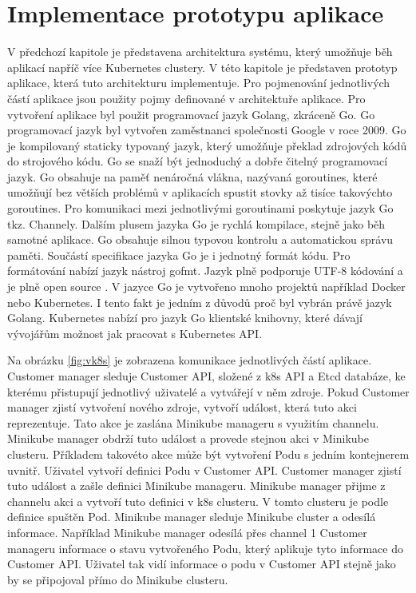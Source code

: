 \section{Implementace prototypu aplikace}
V předchozí kapitole je představena architektura systému, který umožňuje běh aplikací napříč více Kubernetes clustery. V této kapitole je představen prototyp aplikace, která tuto architekturu implementuje. Pro pojmenování jednotlivých částí aplikace jsou použity pojmy definované v architektuře aplikace. Pro vytvoření aplikace byl použit programovací jazyk Golang, zkráceně Go. Go programovací jazyk byl vytvořen zaměstnanci společnosti Google v roce 2009. Go je kompilovaný staticky typovaný jazyk, který umožňuje překlad zdrojových kódů do strojového kódu. Go se snaží být jednoduchý a dobře čitelný programovací jazyk. Go obsahuje na paměť nenáročná vlákna, nazývaná goroutines, které umožňují bez větších problémů v aplikacích spustit stovky až tisíce takovýchto goroutines. Pro komunikaci mezi jednotlivými goroutinami poskytuje jazyk Go tkz. Channely. Dalším plusem jazyka Go je rychlá kompilace, stejně jako běh samotné aplikace. Go obsahuje silnou typovou kontrolu a automatickou správu paměti. Součástí specifikace jazyka Go je i jednotný formát kódu. Pro formátování nabízí jazyk nástroj gofmt. Jazyk plně podporuje UTF-8 kódování a je plně open source \cite{miek}. V jazyce Go je vytvořeno mnoho projektů například Docker nebo Kubernetes. I tento fakt je jedním z důvodů proč byl vybrán právě jazyk Golang. Kubernetes nabízí pro jazyk Go klientské knihovny, které dávají vývojářům možnost jak pracovat s Kubernetes API.\par
    Na obrázku \ref{fig:vk8s} je zobrazena komunikace jednotlivých částí aplikace. Customer manager sleduje Customer API, složené z k8s API a Etcd databáze, ke kterému přistupují jednotlivý uživatelé a vytvářejí v něm zdroje. Pokud Customer manager zjistí vytvoření nového zdroje, vytvoří událost, která tuto akci reprezentuje. Tato akce je zaslána \linebreak Minikube manageru s využitím channelu. Minikube manager obdrží tuto událost a provede stejnou akci v Minikube clusteru. Příkladem takovéto akce může být vytvoření Podu s jedním kontejnerem uvnitř. Uživatel vytvoří definici Podu v Customer API. Customer manager zjistí tuto událost a zašle definici Minikube manageru. Minikube manager přijme z channelu akci a vytvoří tuto definici v k8s clusteru. V tomto clusteru je podle definice spuštěn Pod. Minikube manager sleduje Minikube cluster a odesílá informace. Například Minikube manager odesílá přes channel 1 Customer manageru informace o stavu vytvořeného Podu, který aplikuje tyto informace do Customer API. Uživatel tak vidí informace o podu v Customer API stejně jako by se připojoval přímo do Minikube clusteru.\par


